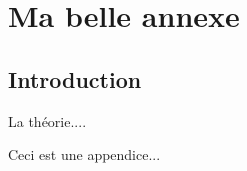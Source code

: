 \chapter{Ma belle annexe} \label{ANNEXE_1}

\section{Introduction}

La th\'eorie....  \medskip

Ceci est une appendice...